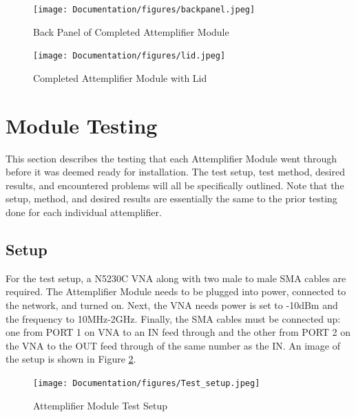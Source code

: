 \documentclass[12pt,a4paper,oneside]{article}
\begin{document}
\begin{figure}[H]
\centering
\texttt{[image: Documentation/figures/backpanel.jpeg]}
\caption{Back Panel of Completed Attemplifier Module}
\label{fig:Module_back}

\hfill \break
\hfill \break

\centering
\texttt{[image: Documentation/figures/lid.jpeg]}
\caption{Completed Attemplifier Module with Lid}
\label{fig:Module_w/_lid}
\end{figure}

\newpage

\section{Module Testing}
\label{sec:8}

This section describes the testing that each Attemplifier Module went through before it was deemed ready for installation. The test setup, test method, desired results, and encountered problems will all be specifically outlined. Note that the setup, method, and desired results are essentially the same to the prior testing done for each individual attemplifier.

\subsection{Setup}
\label{sec:8.1}

For the test setup, a N5230C VNA along with two male to male SMA cables are required. The Attemplifier Module needs to be plugged into power, connected to the network, and turned on. Next, the VNA needs power is set to -10dBm and the frequency to 10MHz-2GHz. Finally, the SMA cables must be connected up: one from PORT 1 on VNA to an IN feed through and the other from PORT 2 on the VNA to the OUT feed through of the same number as the IN. An image of the setup is shown in Figure \ref{fig:Test_Setup}.

 \begin{figure}[H]
 \centering
 \texttt{[image: Documentation/figures/Test\_setup.jpeg]}
 \caption{Attemplifier Module Test Setup}
 \label{fig:Test_Setup}
 \end{figure}
\end{document}
